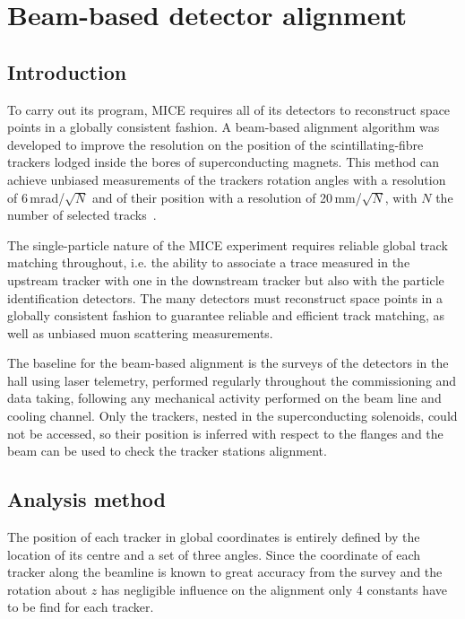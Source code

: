 \graphicspath{{09-Detector-alignment/Figures/}}

\section{Beam-based detector alignment}
\label{Sect:DA}

\subsection{Introduction}
\label{SubSect:DA_Intro}

To carry out its program, MICE requires all of its detectors to reconstruct space points in a globally consistent fashion. A beam-based alignment algorithm was developed to improve the resolution on the position of the scintillating-fibre trackers lodged inside the bores of superconducting magnets. This method can achieve unbiased measurements of the trackers rotation angles with a resolution of 6\,mrad/$\sqrt{N}$ and of their position with a resolution of 20\,mm/$\sqrt{N}$, with $N$ the number of selected tracks~\cite{2018arXiv1805.06623T}.

The single-particle nature of the MICE experiment requires reliable global track matching throughout, i.e. the ability to associate a trace measured in the upstream tracker with one in the downstream tracker but also with the particle identification detectors. The many detectors must reconstruct space points in a globally consistent fashion to guarantee reliable and efficient track matching, as well as unbiased muon scattering measurements.

The baseline for the beam-based alignment is the surveys of the detectors in the hall using laser telemetry, performed regularly throughout the commissioning and data taking, following any mechanical activity performed on the beam line and cooling channel. Only the trackers, nested in the superconducting solenoids, could not be accessed, so their position is inferred with respect to the flanges and the beam can be used to check the tracker stations alignment.

\subsection{Analysis method}
\label{SubSect:DA_Analysis}

The position of each tracker in global coordinates is entirely defined by the location of its centre and a set of three angles.
Since the coordinate of each tracker along the beamline is known to great accuracy from the survey and the rotation about $z$ has negligible influence on the alignment only 4 constants have to be find for each tracker.

